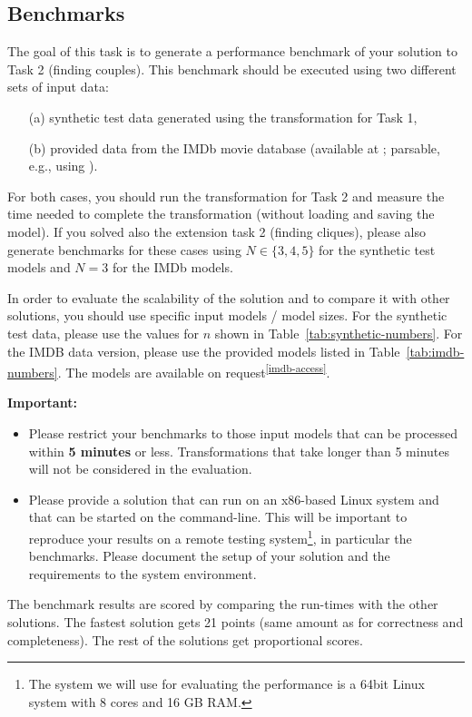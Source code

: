 \documentclass[a4paper,11pt]{article}
\begin{document}
\subsection{Benchmarks}

The goal of this task is to generate a performance benchmark
of your solution to Task 2 (finding couples). This benchmark should be
executed using two different sets of input data:
\begin{enumerate}
\item[(a)] synthetic test data generated using the transformation for Task 1, 
\item[(b)] provided data from the IMDb movie database (available at \cite{IMDBDATA}; parsable, e.g., using \cite{IMDB2EMF}).
\end{enumerate}
For both cases, you should run the transformation for Task 2 
and measure the time needed to complete the transformation 
(without loading and saving the model).
If you solved also the extension task 2 (finding cliques), please also generate
benchmarks for these cases using \(N \in \{3,4,5\}\) for the synthetic test
models and \(N = 3\) for the IMDb models.


In order to evaluate the scalability of the solution and to compare it with other solutions,
you should use specific input models / model sizes. For the synthetic test data, please use
the values for $n$ shown in Table~\ref{tab:synthetic-numbers}. For the IMDB data version,
please use the provided models listed in Table~\ref{tab:imdb-numbers}. The models
are available on request\textsuperscript{\ref{imdb-access}}.


\noindent
\textbf{Important:}
\begin{itemize}
\item Please restrict your benchmarks to those input models that can be
processed within \textbf{5 minutes} or less. Transformations that take longer than 5 minutes
will not be considered in the evaluation.
\item Please provide a solution that can run on an x86-based Linux system and
  that can be started on the command-line. This will be important to reproduce
  your results on a remote testing system\footnote{The system we will use for
    evaluating the performance is a 64bit Linux system with 8 cores and 16 GB
    RAM.}, in particular the benchmarks.  Please document the setup of your
  solution and the requirements to the system environment.
\end{itemize}
The benchmark results are scored by comparing the run-times with the
other solutions. The fastest solution gets 21 points (same amount as for
correctness and completeness). The rest of the solutions get proportional
scores.
\end{document}
